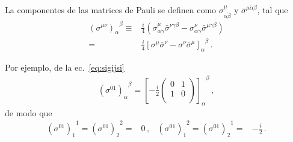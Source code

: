 \begin{frame}
La componentes de las matrices de Pauli se definen como $\sigma^{\mu}_{\alpha\dot{\beta}}$ y $\overline{\sigma}^{\mu\dot{\alpha}\beta}$, tal que
\begin{align}
  \label{eq:smntensor}
  {\left(\sigma^{\mu \nu}\right)_{\alpha}}^{\beta} \equiv & \frac{i}{4}\left(\sigma_{\alpha \dot{\gamma}}^{\mu} \bar{\sigma}^{\nu \dot{\gamma} \beta}-\sigma_{\alpha \dot{\gamma}}^{\nu} \bar{\sigma}^{\mu \dot{\gamma} \beta}\right) \nonumber\\
=&\frac{i}{4}{\left[\sigma^{\mu} \bar{\sigma}^{\nu}-\sigma^{\nu} \bar{\sigma}^{\mu}\right]_{\alpha}}^{\beta}\,.
\end{align}

Por ejemplo, de la ec.~\eqref{eq:sigijsi}
\begin{align*}
  {\left(\sigma^{01}\right)_{\alpha}}^{\beta} =
  {\left[ -\frac{i}{2}
  \begin{pmatrix}
    0 & 1\\
    1 & 0\\
  \end{pmatrix}
\right]_{\alpha}}^{\beta}\,,
\end{align*}
de modo que
\begin{align*}
  {\left(\sigma^{0 1}\right)_{1}}^{1} =   {\left(\sigma^{0 1}\right)_{2}}^{2}=&0\,,
  &{\left(\sigma^{0 1}\right)_{1}}^{2} =   {\left(\sigma^{0 1}\right)_{2}}^{1}=&-\frac{i}{2}\,.
\end{align*}
\end{frame}


